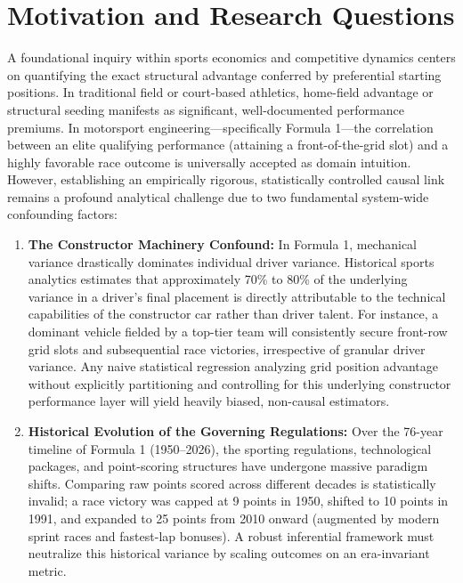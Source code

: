 \section{Motivation and Research Questions}
\label{sec:motivation}

A foundational inquiry within sports economics and competitive dynamics centers on quantifying the exact structural advantage conferred by preferential starting positions. In traditional field or court-based athletics, home-field advantage or structural seeding manifests as significant, well-documented performance premiums. In motorsport engineering—specifically Formula 1—the correlation between an elite qualifying performance (attaining a front-of-the-grid slot) and a highly favorable race outcome is universally accepted as domain intuition. However, establishing an empirically rigorous, statistically controlled causal link remains a profound analytical challenge due to two fundamental system-wide confounding factors:

\begin{enumerate}
    \item \textbf{The Constructor Machinery Confound:} In Formula 1, mechanical variance drastically dominates individual driver variance. Historical sports analytics estimates that approximately 70\% to 80\% of the underlying variance in a driver's final placement is directly attributable to the technical capabilities of the constructor car rather than driver talent. For instance, a dominant vehicle fielded by a top-tier team will consistently secure front-row grid slots and subsequential race victories, irrespective of granular driver variance. Any naive statistical regression analyzing grid position advantage without explicitly partitioning and controlling for this underlying constructor performance layer will yield heavily biased, non-causal estimators. 
    \item \textbf{Historical Evolution of the Governing Regulations:} Over the 76-year timeline of Formula 1 (1950--2026), the sporting regulations, technological packages, and point-scoring structures have undergone massive paradigm shifts. Comparing raw points scored across different decades is statistically invalid; a race victory was capped at 9 points in 1950, shifted to 10 points in 1991, and expanded to 25 points from 2010 onward (augmented by modern sprint races and fastest-lap bonuses). A robust inferential framework must neutralize this historical variance by scaling outcomes on an era-invariant metric.
\end{enumerate}

